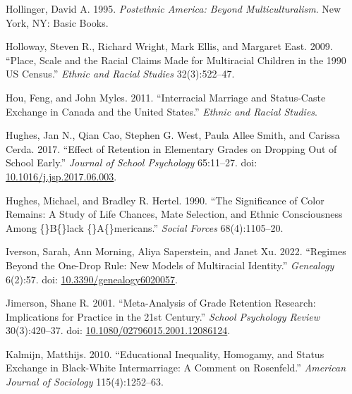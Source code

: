 \documentclass[
  letterpaper,
  DIV=11,
  numbers=noendperiod]{scrartcl}
\newlength{\cslhangindent}
\newlength{\cslentryspacingunit} %
\newenvironment{CSLReferences}[2] %
 {%
  \setlength{\parindent}{0pt}
  \ifodd #1
  \let\oldpar\par
  \def\par{\hangindent=\cslhangindent\oldpar}
  \fi
  \setlength{\parskip}{#2\cslentryspacingunit}
 }%
 {}
\begin{document}
\begin{CSLReferences}{1}{0}
\leavevmode{}%
Hollinger, David A. 1995. \emph{Postethnic {America}: {Beyond
Multiculturalism}}. {New York, NY}: {Basic Books}.

\leavevmode{}%
Holloway, Steven R., Richard Wright, Mark Ellis, and Margaret East.
2009. {``Place, Scale and the Racial Claims Made for Multiracial
Children in the 1990 {US Census}.''} \emph{Ethnic and Racial Studies}
32(3):522--47.

\leavevmode{}%
Hou, Feng, and John Myles. 2011. {``Interracial Marriage and
Status-Caste Exchange in {Canada} and the {United States}.''}
\emph{Ethnic and Racial Studies}.

\leavevmode{}%
Hughes, Jan N., Qian Cao, Stephen G. West, Paula Allee Smith, and
Carissa Cerda. 2017. {``Effect of Retention in Elementary Grades on
Dropping Out of School Early.''} \emph{Journal of School Psychology}
65:11--27. doi:
\href{https://doi.org/10.1016/j.jsp.2017.06.003}{10.1016/j.jsp.2017.06.003}.

\leavevmode{}%
Hughes, Michael, and Bradley R. Hertel. 1990. {``The {Significance} of
{Color Remains}: {A Study} of {Life Chances}, {Mate Selection}, and
{Ethnic Consciousness Among} \{\vphantom\}{B}\vphantom\{\}lack
\{\vphantom\}{A}\vphantom\{\}mericans.''} \emph{Social Forces}
68(4):1105--20.

\leavevmode{}%
Iverson, Sarah, Ann Morning, Aliya Saperstein, and Janet Xu. 2022.
{``Regimes Beyond the {One-Drop Rule}: {New Models} of {Multiracial
Identity}.''} \emph{Genealogy} 6(2):57. doi:
\href{https://doi.org/10.3390/genealogy6020057}{10.3390/genealogy6020057}.

\leavevmode{}%
Jimerson, Shane R. 2001. {``Meta-Analysis of {Grade Retention Research}:
{Implications} for {Practice} in the 21st {Century}.''} \emph{School
Psychology Review} 30(3):420--37. doi:
\href{https://doi.org/10.1080/02796015.2001.12086124}{10.1080/02796015.2001.12086124}.

\leavevmode{}%
Kalmijn, Matthijs. 2010. {``Educational Inequality, Homogamy, and Status
Exchange in Black-White Intermarriage: A Comment on {Rosenfeld}.''}
\emph{American Journal of Sociology} 115(4):1252--63.


\end{CSLReferences}
\end{document}
